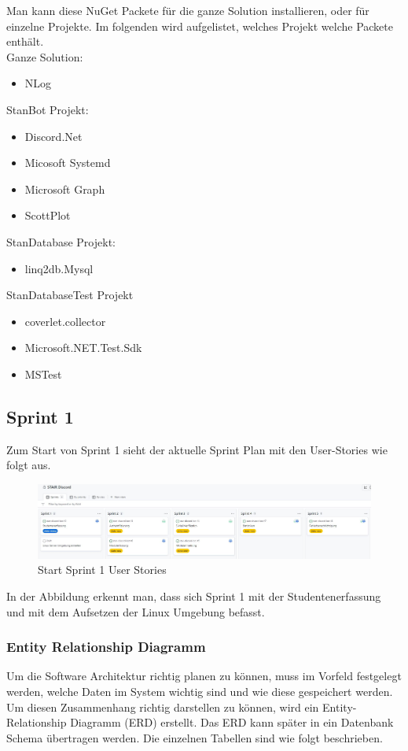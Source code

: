 \documentclass[a4paper, table]{article}
\begin{document}
Man kann diese NuGet Packete für die ganze Solution installieren, oder für einzelne Projekte.
Im folgenden wird aufgelistet, welches Projekt welche Packete enthält.\\
Ganze Solution:
\begin{itemize}
    \item NLog
\end{itemize}
StanBot Projekt:
\begin{itemize}
    \item Discord.Net
    \item Micosoft Systemd
    \item Microsoft Graph
    \item ScottPlot
\end{itemize}
StanDatabase Projekt:
\begin{itemize}
    \item linq2db.Mysql
\end{itemize}
StanDatabaseTest Projekt
\begin{itemize}
    \item coverlet.collector
    \item Microsoft.NET.Test.Sdk
    \item MSTest
\end{itemize}

\newpage
\subsection{Sprint 1}
Zum Start von Sprint 1 sieht der aktuelle Sprint Plan mit den User-Stories wie folgt aus.
\begin{figure}[h]
    \centering
    \hspace*{-2cm}
    \includegraphics[width=1.3\textwidth]{img/Start_Sprint1_Stories.jpg}
    \caption{Start Sprint 1 User Stories}
    \label{fig:start_sprint_one}
\end{figure}

In der Abbildung erkennt man, dass sich Sprint 1 mit der Studentenerfassung und
mit dem Aufsetzen der Linux Umgebung befasst.

\subsubsection{Entity Relationship Diagramm}
Um die Software Architektur richtig planen zu können, muss im Vorfeld festgelegt werden,
welche Daten im System wichtig sind und wie diese gespeichert werden.
Um diesen Zusammenhang richtig darstellen zu können, wird ein Entity-Relationship Diagramm (ERD) erstellt.
Das ERD kann später in ein Datenbank Schema übertragen werden.
Die einzelnen Tabellen sind wie folgt beschrieben.
\end{document}
